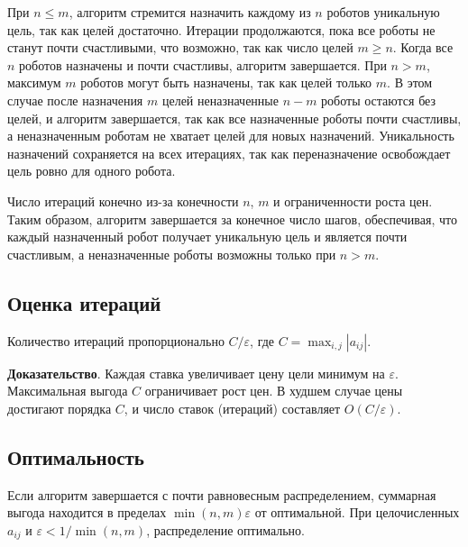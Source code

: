 При \( n \leq m \), алгоритм стремится назначить каждому из \( n \) роботов уникальную цель, так как целей достаточно. Итерации продолжаются, пока все роботы не станут почти счастливыми, что возможно, так как число целей \( m \geq n \). Когда все \( n \) роботов назначены и почти счастливы, алгоритм завершается. При \( n > m \), максимум \( m \) роботов могут быть назначены, так как целей только \( m \). В этом случае после назначения \( m \) целей неназначенные \( n - m \) роботы остаются без целей, и алгоритм завершается, так как все назначенные роботы почти счастливы, а неназначенным роботам не хватает целей для новых назначений. Уникальность назначений сохраняется на всех итерациях, так как переназначение освобождает цель ровно для одного робота.

Число итераций конечно из-за конечности \( n \), \( m \) и ограниченности роста цен. Таким образом, алгоритм завершается за конечное число шагов, обеспечивая, что каждый назначенный робот получает уникальную цель и является почти счастливым, а неназначенные роботы возможны только при \( n > m \).

\subsection{Оценка итераций}
\begin{claim}
\label{claim:auction_iterations}
Количество итераций пропорционально \( C / \varepsilon \), где \( C = \max_{i,j} |a_{ij}| \).
\end{claim}

\textbf{Доказательство}. Каждая ставка увеличивает цену цели минимум на \( \varepsilon \). Максимальная выгода \( C \) ограничивает рост цен. В худшем случае цены достигают порядка \( C \), и число ставок (итераций) составляет \( O(C / \varepsilon) \).

\subsection{Оптимальность}
\begin{theorem}
\label{thm:auction_optimality}
Если алгоритм завершается с почти равновесным распределением, суммарная выгода находится в пределах \( \min(n, m) \varepsilon \) от оптимальной. При целочисленных \( a_{ij} \) и \( \varepsilon < 1/\min(n, m) \), распределение оптимально.
\end{theorem}

